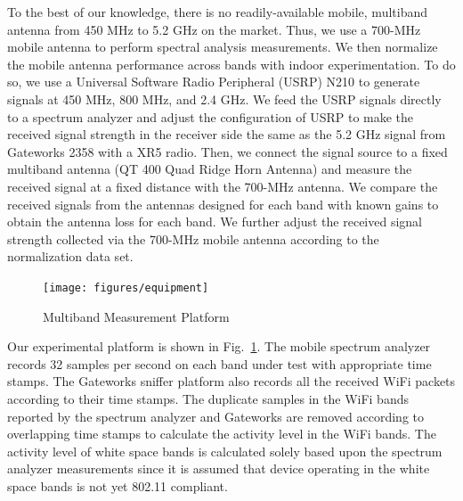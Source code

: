 To the best of our knowledge, there is no readily-available mobile, multiband antenna from 450 MHz to 5.2 
GHz on the market. Thus, we use a 700-MHz mobile antenna to perform spectral analysis measurements. We then 
normalize the mobile antenna performance across bands with indoor experimentation. To do so, we use a 
Universal Software Radio Peripheral (USRP) N210 to generate signals at 450 MHz, 800 MHz, and 2.4 GHz. We 
feed the USRP signals directly to a spectrum analyzer and adjust the configuration of USRP to make the 
received signal strength in the receiver side the same as the 5.2 GHz signal from Gateworks 2358 with 
a XR5 radio. 
Then, we connect the signal source to a fixed multiband antenna (QT 400 Quad Ridge Horn Antenna) and 
measure the received signal at a fixed distance with the 700-MHz antenna. We compare the received 
signals from the antennas designed for each band with known gains to obtain the antenna loss for 
each band. We further adjust the received signal strength collected via the 700-MHz mobile antenna 
according to the normalization data set.

  \begin{figure}
  \centering
  \texttt{[image: figures/equipment]}
  \vspace{-0.1in}
  \caption{Multiband Measurement Platform}
  \label{fig:equipment}
  \vspace{-0.3in}
  \end{figure}
  
Our experimental platform is shown in Fig.~\ref{fig:equipment}. The mobile spectrum analyzer records 32 samples 
per second on each band under test with appropriate time stamps. The Gateworks sniffer platform also records all 
the received WiFi packets according to their time stamps. The duplicate samples in the WiFi bands reported by the spectrum analyzer 
and Gateworks are removed according to overlapping time stamps to calculate the activity level in the WiFi 
bands. The activity level of white space bands is calculated solely based upon the spectrum analyzer measurements 
since it is assumed that device operating in the white space bands is not yet 802.11 compliant.

